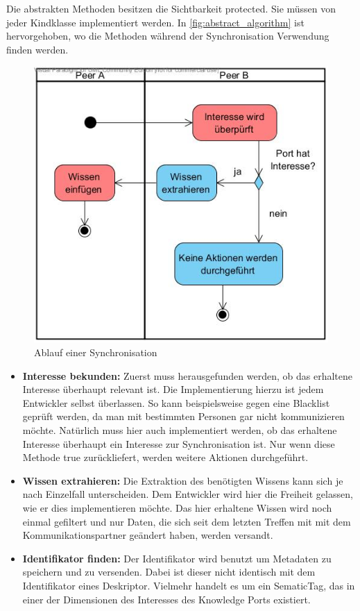 \documentclass[a4paper]{article}
\begin{document}
	Die abstrakten Methoden besitzen die Sichtbarkeit protected. Sie 
	müssen von jeder Kindklasse implementiert werden. In
	\autoref{fig:abstract_algorithm} ist hervorgehoben, wo
	die Methoden während der Synchronisation Verwendung finden werden. 
	
	\begin{figure}[H]
		\includegraphics[width=\linewidth]{../Bilder/abstract_algorithm.jpg}
		\caption{Ablauf einer Synchronisation}
		\label{fig:abstract_algorithm}
	\end{figure}	
		
	\newpage
	\begin{itemize}
		\item \textbf{Interesse bekunden:} Zuerst muss herausgefunden werden,
		ob das erhaltene Interesse überhaupt relevant ist. Die Implementierung
		hierzu ist jedem Entwickler selbst überlassen. So kann beispielsweise
		gegen eine Blacklist geprüft werden, da man mit bestimmten Personen
		gar nicht kommunizieren möchte. Natürlich muss hier auch implementiert 
		werden, ob das erhaltene Interesse überhaupt ein Interesse zur
		Synchronisation ist. Nur wenn diese Methode true zurückliefert, werden
		weitere Aktionen durchgeführt.
		\item \textbf{Wissen extrahieren:} Die Extraktion des benötigten Wissens 
		kann sich je nach Einzelfall unterscheiden. Dem Entwickler wird hier die
		Freiheit gelassen, wie er dies implementieren möchte. Das hier 
		erhaltene Wissen wird noch einmal gefiltert und nur Daten, die sich seit
		dem letzten Treffen mit mit dem Kommunikationspartner geändert haben,
		werden versandt.
		\item \textbf{Identifikator finden:} Der Identifikator wird benutzt
		um Metadaten zu speichern und zu versenden. Dabei ist dieser nicht
		identisch mit dem Identifikator eines Deskriptor. Vielmehr handelt es
		um ein SematicTag, das in einer der Dimensionen des Interesses des
		Knowledge Ports existiert.
	\end{itemize}
	
\end{document}
